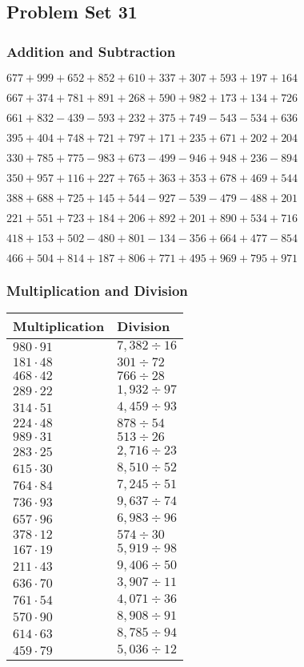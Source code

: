 \hypertarget{problem-set-31-2}{%
\subsection{Problem Set 31}\label{problem-set-31-2}}

\hypertarget{addition-and-subtraction-131}{%
\subsubsection{Addition and
Subtraction}\label{addition-and-subtraction-131}}

\(677 + 999 + 652 + 852 + 610 + 337 + 307 + 593 + 197 + 164\)

\(667 + 374 + 781 + 891 + 268 + 590 + 982 + 173 + 134 + 726\)

\(661 + 832 - 439 - 593 + 232 + 375 + 749 - 543 - 534 + 636\)

\(395 + 404 + 748 + 721 + 797 + 171 + 235 + 671 + 202 + 204\)

\(330 + 785 + 775 - 983 + 673 - 499 - 946 + 948 + 236 - 894\)

\(350 + 957 + 116 + 227 + 765 + 363 + 353 + 678 + 469 + 544\)

\(388 + 688 + 725 + 145 + 544 - 927 - 539 - 479 - 488 + 201\)

\(221 + 551 + 723 + 184 + 206 + 892 + 201 + 890 + 534 + 716\)

\(418 + 153 + 502 - 480 + 801 - 134 - 356 + 664 + 477 - 854\)

\(466 + 504 + 814 + 187 + 806 + 771 + 495 + 969 + 795 + 971\)

\hypertarget{multiplication-and-division-131}{%
\subsubsection{Multiplication and
Division}\label{multiplication-and-division-131}}

\begin{longtable}[]{@{}ll@{}}
\toprule
Multiplication & Division\tabularnewline
\midrule
\endhead
\(980 \cdot 91\) & \(7,382÷16\)\tabularnewline
\(181 \cdot 48\) & \(301÷72\)\tabularnewline
\(468 \cdot 42\) & \(766÷28\)\tabularnewline
\(289 \cdot 22\) & \(1,932÷97\)\tabularnewline
\(314 \cdot 51\) & \(4,459÷93\)\tabularnewline
\(224 \cdot 48\) & \(878÷54\)\tabularnewline
\(989 \cdot 31\) & \(513÷26\)\tabularnewline
\(283 \cdot 25\) & \(2,716÷23\)\tabularnewline
\(615 \cdot 30\) & \(8,510÷52\)\tabularnewline
\(764 \cdot 84\) & \(7,245÷51\)\tabularnewline
\(736 \cdot 93\) & \(9,637÷74\)\tabularnewline
\(657 \cdot 96\) & \(6,983÷96\)\tabularnewline
\(378 \cdot 12\) & \(574 ÷30\)\tabularnewline
\(167 \cdot 19\) & \(5,919÷98\)\tabularnewline
\(211 \cdot 43\) & \(9,406÷50\)\tabularnewline
\(636 \cdot 70\) & \(3,907÷11\)\tabularnewline
\(761 \cdot 54\) & \(4,071÷36\)\tabularnewline
\(570 \cdot 90\) & \(8,908÷91\)\tabularnewline
\(614 \cdot 63\) & \(8,785÷94\)\tabularnewline
\(459 \cdot 79\) & \(5,036÷12\)\tabularnewline
\bottomrule
\end{longtable}

